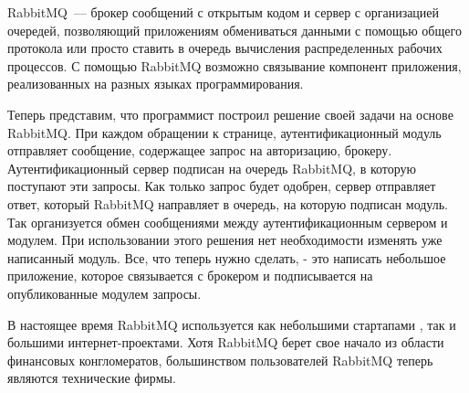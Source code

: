 RabbitMQ~--- брокер сообщений с открытым кодом и сервер с организацией очередей, позволяющий приложениям обмениваться данными с помощью общего протокола или просто ставить в очередь вычисления распределенных рабочих процессов. С помощью RabbitMQ возможно связывание компонент приложения, реализованных на разных языках программирования.

Теперь представим, что программист построил решение своей задачи на основе RabbitMQ. При каждом обращении к странице, аутентификационный модуль отправляет сообщение, содержащее запрос на авторизацию, брокеру. Аутентификационный сервер подписан на очередь RabbitMQ, в которую поступают эти запросы. Как только запрос будет одобрен, сервер отправляет ответ, который RabbitMQ направляет в очередь, на которую подписан модуль. Так организуется обмен сообщениями между аутентификационным сервером и модулем. При использовании этого решения нет необходимости изменять уже написанный модуль.  Все, что теперь нужно сделать, - это написать небольшое приложение, которое связывается с брокером и подписывается на опубликованные модулем запросы.

В настоящее время RabbitMQ используется как небольшими стартапами , так и большими интернет-проектами. Хотя RabbitMQ берет свое начало из области финансовых конгломератов, большинством пользователей RabbitMQ теперь являются технические фирмы.\par 
